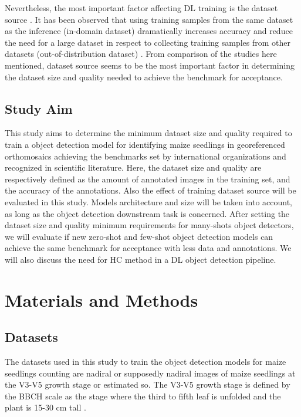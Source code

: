 \documentclass[12pt,a4paper,oneside]{report}
\begin{document}
Nevertheless, the most important factor affecting DL training is the dataset source 
\cite{sunRevisitingUnreasonableEffectiveness2017}. 
It has been observed that using training samples from the same
dataset as the inference (in-domain dataset) dramatically increases accuracy and reduce the need 
for a large dataset in respect to collecting training samples from other 
datasets (out-of-distribution dataset) \cite{davidPlantDetectionCounting2021,andvaagCountingCanolaGeneralizable2024}. 
From comparison of the studies here mentioned, dataset source seems to be the most 
important factor in determining the dataset size and quality needed to achieve the benchmark 
for acceptance.

\subsection{Study Aim}

This study aims to determine the minimum dataset size and quality required to train 
a object detection model for identifying maize seedlings in georeferenced orthomosaics
achieving the benchmarks set by international organizations and recognized in scientific literature.
Here, the dataset size and quality are respectively defined as the amount of annotated 
images in the training set, and the accuracy of the annotations.
Also the effect of training dataset source will be evaluated in this study.
Models architecture and size will be taken into account, as long as the object detection
downstream task is concerned. 
After setting the dataset size and quality minimum requirements for many-shots
object detectors, we will evaluate if new zero-shot and few-shot object detection
models can achieve the same benchmark for acceptance with less data and annotations.
We will also discuss the need for HC method in a DL object detection pipeline.

\section{Materials and Methods}

\subsection{Datasets}
The datasets used in this study to train the object detection models for maize seedlings
counting are nadiral or supposedly nadiral images of maize seedlings at the V3-V5 growth stage
or estimated so.
The V3-V5 growth stage is defined by the BBCH scale as the stage where the third to fifth
leaf is unfolded and the plant is 15-30 cm tall \cite{meierBBCHSystemCoding2009}.
\end{document}
